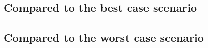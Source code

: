 \documentclass[a4paper,12pt]{article}
\begin{document}
\subsection{Compared to the best case scenario}

\subsection{Compared to the worst case scenario}


\newpage
{}
{}
\listoffigures

\newpage
{}
{}


\end{document}
